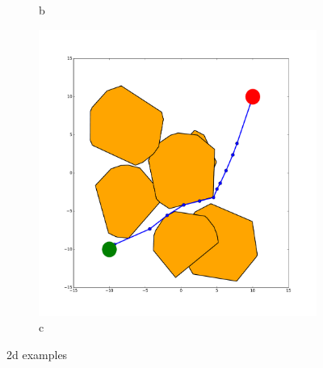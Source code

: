 \documentclass[12pt]{article}
\begin{document}
\begin{figure}[t!]
\begin{subfigure}[t]{0.32\textwidth}
        \caption{b}
    \end{subfigure}
    \begin{subfigure}[t]{0.32\textwidth}
        \centering
        \includegraphics[width=\textwidth]{2d_example_3.pdf}
        \caption{c}
    \end{subfigure}
    \caption{2d examples}
    \label{fig:2d_examples}
\end{figure}
\end{document}
